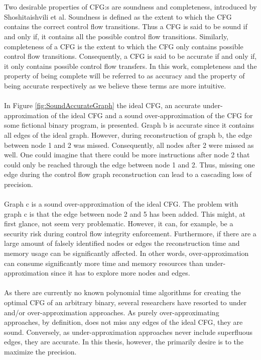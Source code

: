 \documentclass{kththesis}
\begin{document}
\\ \\
Two desirable properties of CFG:s are soundness and completeness, introduced by Shoshitaishvili et al\cite{angr}. Soundness is defined as the extent to which the CFG contains the correct control flow transitions. Thus a CFG is said to be sound if and only if, it contains all the possible control flow transitions. Similarly, completeness of a CFG is the extent to which the CFG only contains possible control flow transitions. Consequently, a CFG is said to be accurate if and only if, it only contains possible control flow transfers. In this work, completeness and the property of being complete will be referred to as accuracy and the property of being accurate respectively as we believe these terms are more intuitive.
\\ \\
In Figure \ref{fig:SoundAccurateGraph} the ideal CFG, an accurate under-approximation of the ideal CFG and a sound over-approximation of the CFG for some fictional binary program, is presented. Graph b is accurate since it contains all edges of the ideal graph. However, during reconstruction of graph b, the edge between node 1 and 2 was missed. Consequently, all nodes after 2 were missed as well. One could imagine that there could be more instructions after node 2 that could only be reached through the edge between node 1 and 2. Thus, missing one edge during the control flow graph reconstruction can lead to a cascading loss of precision.
\\ \\
Graph c is a sound over-approximation of the ideal CFG. The problem with graph c is that the edge between node 2 and 5 has been added. This might, at first glance, not seem very problematic. However, it can, for example, be a security risk during control flow integrity enforcement. Furthermore, if there are a large amount of falsely identified nodes or edges the reconstruction time and memory usage can be significantly affected. In other words, over-approximation can consume significantly more time and memory resources than under-approximation since it has to explore more nodes and edges\cite{alternating}.
\\ \\
As there are currently no known polynomial time algorithms for creating the optimal CFG of an arbitrary binary, several researchers have resorted to under and/or over-approximation approaches\cite{preciseCFGBoolean}\cite{preciseCFG}\cite{CFGFromPowerPC}\cite{angr}. As purely over-approximating approaches, by definition, does not miss any edges of the ideal CFG, they are sound. Conversely, as under-approximation approaches never include superfluous edges, they are accurate. In this thesis, however, the primarily desire is to the maximize the precision.
\end{document}
